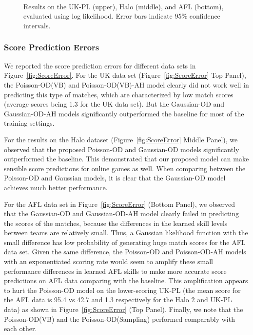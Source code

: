 \begin{center}
\begin{figure}[htbp!]
 \centering
 \\
\\
\\
\caption{\small Results on the UK-PL (upper), Halo (middle), and AFL (bottom), evaluated
using log likelihood. Error bars indicate
95\% confidence intervals.}
\label{fig:logLik}
\end{figure}
\end{center}

\subsubsection{Score Prediction Errors}
We reported the score prediction errors for different data sets in Figure~\ref{fig:ScoreError}. For the UK data set (Figure~\ref{fig:ScoreError} Top Panel), the Poisson-OD(VB) and Poisson-OD(VB)-AH model clearly did not work well in predicting this type of matches, which are characterized by low match scores (average scores being 1.3 for the UK data set). But the Gaussian-OD and Gaussian-OD-AH models significantly outperformed the baseline for most of the training settings. 

For the results on the Halo dataset (Figure~\ref{fig:ScoreError} Middle Panel), we observed that the proposed Poisson-OD and Gaussian-OD models significantly outperformed the baseline. This demonstrated that our proposed model can make sensible score predictions for online games as well. When comparing between the Poisson-OD and Gaussian models, it is clear that the Gaussian-OD model achieves much better performance.

For the AFL data set in Figure~\ref{fig:ScoreError} (Bottom Panel), we observed that the Gaussian-OD and Gaussian-OD-AH model clearly failed in predicting the scores of the matches, because the differences in the learned skill levels between teams are relatively small. Thus, a Gaussian likelihood function with the small difference has low probability of generating huge match scores for the AFL data set. Given the same difference, the Poisson-OD and Poisson-OD-AH models with an exponentiated scoring rate would seem to amplify these small performance differences in learned AFL skills to make more accurate score predictions on AFL data comparing with the baseline. This amplification appears to hurt the Poisson-OD model on the lower-scoring UK-PL (the mean score for the AFL data is 95.4 vs 42.7 and 1.3 respectively for the Halo 2 and UK-PL data) as shown in Figure~\ref{fig:ScoreError} (Top Panel). Finally, we note that the Poisson-OD(VB) and the Poisson-OD(Sampling) performed comparably with each other. 

